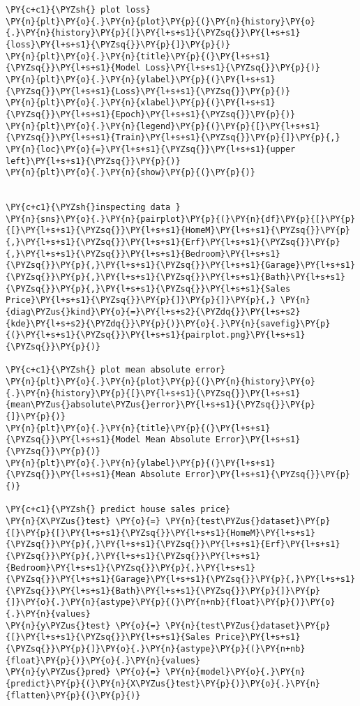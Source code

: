 \begin{tcolorbox}[breakable, size=fbox, boxrule=1pt, pad at break*=1mm,colback=cellbackground, colframe=cellborder]
\begin{Verbatim}[commandchars=\\\{\}]
\PY{c+c1}{\PYZsh{} plot loss}
\PY{n}{plt}\PY{o}{.}\PY{n}{plot}\PY{p}{(}\PY{n}{history}\PY{o}{.}\PY{n}{history}\PY{p}{[}\PY{l+s+s1}{\PYZsq{}}\PY{l+s+s1}{loss}\PY{l+s+s1}{\PYZsq{}}\PY{p}{]}\PY{p}{)}
\PY{n}{plt}\PY{o}{.}\PY{n}{title}\PY{p}{(}\PY{l+s+s1}{\PYZsq{}}\PY{l+s+s1}{Model Loss}\PY{l+s+s1}{\PYZsq{}}\PY{p}{)}
\PY{n}{plt}\PY{o}{.}\PY{n}{ylabel}\PY{p}{(}\PY{l+s+s1}{\PYZsq{}}\PY{l+s+s1}{Loss}\PY{l+s+s1}{\PYZsq{}}\PY{p}{)}
\PY{n}{plt}\PY{o}{.}\PY{n}{xlabel}\PY{p}{(}\PY{l+s+s1}{\PYZsq{}}\PY{l+s+s1}{Epoch}\PY{l+s+s1}{\PYZsq{}}\PY{p}{)}
\PY{n}{plt}\PY{o}{.}\PY{n}{legend}\PY{p}{(}\PY{p}{[}\PY{l+s+s1}{\PYZsq{}}\PY{l+s+s1}{Train}\PY{l+s+s1}{\PYZsq{}}\PY{p}{]}\PY{p}{,} \PY{n}{loc}\PY{o}{=}\PY{l+s+s1}{\PYZsq{}}\PY{l+s+s1}{upper left}\PY{l+s+s1}{\PYZsq{}}\PY{p}{)}
\PY{n}{plt}\PY{o}{.}\PY{n}{show}\PY{p}{(}\PY{p}{)}


\PY{c+c1}{\PYZsh{}inspecting data }
\PY{n}{sns}\PY{o}{.}\PY{n}{pairplot}\PY{p}{(}\PY{n}{df}\PY{p}{[}\PY{p}{[}\PY{l+s+s1}{\PYZsq{}}\PY{l+s+s1}{HomeM}\PY{l+s+s1}{\PYZsq{}}\PY{p}{,}\PY{l+s+s1}{\PYZsq{}}\PY{l+s+s1}{Erf}\PY{l+s+s1}{\PYZsq{}}\PY{p}{,}\PY{l+s+s1}{\PYZsq{}}\PY{l+s+s1}{Bedroom}\PY{l+s+s1}{\PYZsq{}}\PY{p}{,}\PY{l+s+s1}{\PYZsq{}}\PY{l+s+s1}{Garage}\PY{l+s+s1}{\PYZsq{}}\PY{p}{,}\PY{l+s+s1}{\PYZsq{}}\PY{l+s+s1}{Bath}\PY{l+s+s1}{\PYZsq{}}\PY{p}{,}\PY{l+s+s1}{\PYZsq{}}\PY{l+s+s1}{Sales Price}\PY{l+s+s1}{\PYZsq{}}\PY{p}{]}\PY{p}{]}\PY{p}{,} \PY{n}{diag\PYZus{}kind}\PY{o}{=}\PY{l+s+s2}{\PYZdq{}}\PY{l+s+s2}{kde}\PY{l+s+s2}{\PYZdq{}}\PY{p}{)}\PY{o}{.}\PY{n}{savefig}\PY{p}{(}\PY{l+s+s1}{\PYZsq{}}\PY{l+s+s1}{pairplot.png}\PY{l+s+s1}{\PYZsq{}}\PY{p}{)}

\PY{c+c1}{\PYZsh{} plot mean absolute error}
\PY{n}{plt}\PY{o}{.}\PY{n}{plot}\PY{p}{(}\PY{n}{history}\PY{o}{.}\PY{n}{history}\PY{p}{[}\PY{l+s+s1}{\PYZsq{}}\PY{l+s+s1}{mean\PYZus{}absolute\PYZus{}error}\PY{l+s+s1}{\PYZsq{}}\PY{p}{]}\PY{p}{)}
\PY{n}{plt}\PY{o}{.}\PY{n}{title}\PY{p}{(}\PY{l+s+s1}{\PYZsq{}}\PY{l+s+s1}{Model Mean Absolute Error}\PY{l+s+s1}{\PYZsq{}}\PY{p}{)}
\PY{n}{plt}\PY{o}{.}\PY{n}{ylabel}\PY{p}{(}\PY{l+s+s1}{\PYZsq{}}\PY{l+s+s1}{Mean Absolute Error}\PY{l+s+s1}{\PYZsq{}}\PY{p}{)}

\PY{c+c1}{\PYZsh{} predict house sales price}
\PY{n}{X\PYZus{}test} \PY{o}{=} \PY{n}{test\PYZus{}dataset}\PY{p}{[}\PY{p}{[}\PY{l+s+s1}{\PYZsq{}}\PY{l+s+s1}{HomeM}\PY{l+s+s1}{\PYZsq{}}\PY{p}{,}\PY{l+s+s1}{\PYZsq{}}\PY{l+s+s1}{Erf}\PY{l+s+s1}{\PYZsq{}}\PY{p}{,}\PY{l+s+s1}{\PYZsq{}}\PY{l+s+s1}{Bedroom}\PY{l+s+s1}{\PYZsq{}}\PY{p}{,}\PY{l+s+s1}{\PYZsq{}}\PY{l+s+s1}{Garage}\PY{l+s+s1}{\PYZsq{}}\PY{p}{,}\PY{l+s+s1}{\PYZsq{}}\PY{l+s+s1}{Bath}\PY{l+s+s1}{\PYZsq{}}\PY{p}{]}\PY{p}{]}\PY{o}{.}\PY{n}{astype}\PY{p}{(}\PY{n+nb}{float}\PY{p}{)}\PY{o}{.}\PY{n}{values}
\PY{n}{y\PYZus{}test} \PY{o}{=} \PY{n}{test\PYZus{}dataset}\PY{p}{[}\PY{l+s+s1}{\PYZsq{}}\PY{l+s+s1}{Sales Price}\PY{l+s+s1}{\PYZsq{}}\PY{p}{]}\PY{o}{.}\PY{n}{astype}\PY{p}{(}\PY{n+nb}{float}\PY{p}{)}\PY{o}{.}\PY{n}{values}
\PY{n}{y\PYZus{}pred} \PY{o}{=} \PY{n}{model}\PY{o}{.}\PY{n}{predict}\PY{p}{(}\PY{n}{X\PYZus{}test}\PY{p}{)}\PY{o}{.}\PY{n}{flatten}\PY{p}{(}\PY{p}{)}


\end{Verbatim}
\end{tcolorbox}
